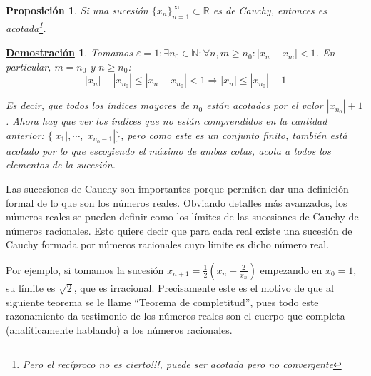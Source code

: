 \documentclass[10pt,a4paper,openright]{book}
\theoremstyle{break}
\newtheorem{prop}{Proposición}[chapter]
\newtheorem*{demo}{\underline{Demostración}}
\begin{document}
\begin{prop}
Si una sucesión $\{x_n\}_{n=1}^\infty\subset \mathbb R$ es de Cauchy, entonces es acotada\footnote{Pero el recíproco no es cierto!!!, puede ser acotada pero no convergente}.\par
\end{prop}
\begin{demo}
Tomamos $\varepsilon=1: \exists n_0\in \mathbb N: \forall n,m\geq n_0: |x_n-x_m|<1$. En particular, $m=n_0$ y $n\geq n_0$:
$$|x_n|-|x_{n_0}|\leq |x_n-x_{n_0}|<1\Rightarrow |x_n|\leq |x_{n_0}|+1$$

Es decir, que todos los índices mayores de $n_0$ están acotados por el valor $|x_{n_0}|+1$. Ahora hay que ver los índices que no están comprendidos en la cantidad anterior: $\{|x_1|, \cdots, |x_{n_0-1}|\}$, pero como este es un conjunto finito, también está acotado por lo que escogiendo el máximo de ambas cotas, acota a todos los elementos de la sucesión.
\end{demo}

Las sucesiones de Cauchy son importantes porque permiten dar una definición formal de lo que son los números reales. Obviando detalles más avanzados, los números reales se pueden definir como los límites de las sucesiones de Cauchy de números racionales. Esto quiere decir que para cada real existe una sucesión de Cauchy formada por números racionales cuyo límite es dicho número real.

Por ejemplo, si tomamos la sucesión $x_{n+1} = \frac{1}{2}\left( x_n + \frac{2}{x_n} \right)$ empezando en $x_0=1$, su límite es $\sqrt{2}$, que es irracional. Precisamente este es el motivo de que al siguiente teorema se le llame ``Teorema de completitud'', pues todo este razonamiento da testimonio de los números reales son el cuerpo que completa (analíticamente hablando) a los números racionales.
\end{document}
